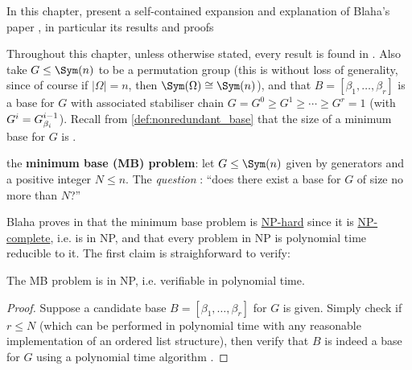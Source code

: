 In this chapter,  present a self-contained expansion and explanation of Blaha's paper \cite{blaha1992}, in particular its results and proofs

Throughout this chapter, unless otherwise stated, every result is found in \cite{blaha1992}. Also take $G \leq \Sym(n)$ to be a permutation group (this is without loss of generality, since of course if $|\Omega| = n$, then $\Sym(\Omega) \cong \Sym(n)$), and that $B = [\beta_1,\dotsc,\beta_r]$ is a base for $G$ with associated stabiliser chain $G = G^0 \geq G^1 \geq \dotsb \geq G^r = 1$ (with $G^i = \added{2}{G^{i-1}_{\beta_i}}$). Recall from \autoref{def:nonredundant_base} that the size of a minimum base for $G$ is . %

 the \textbf{minimum base (MB) problem}: let $G \leq \Sym(n)$ given by generators and a positive integer $N \leq n$. The \textit{question} : ``does there exist a base for $G$ of size no more than $N$?''

Blaha proves in \cite{blaha1992} that the minimum base problem is \hyperref[def:NP_hard]{NP-hard} since it is \hyperref[def:NP_complete]{NP-complete}, i.e.  is in NP, and that every problem in NP is polynomial time reducible to it. The first claim is straighforward to verify:

\begin{lemma}
    The MB problem is in NP, i.e. verifiable in polynomial time.
\end{lemma}

\begin{proof}
    Suppose a candidate base $B = [\beta_1,\dotsc,\beta_r]$ for $G$ is given. Simply check if $r \leq N$ (which can be performed in polynomial time with any reasonable implementation of an ordered list structure), then verify that $B$ is indeed a base for $G$ using a polynomial time algorithm .
\end{proof}

